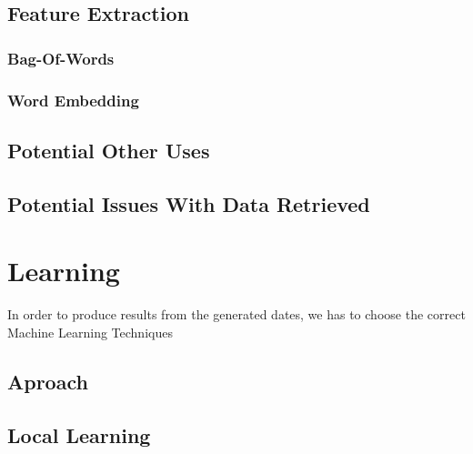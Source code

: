 \documentclass[bsc,frontabs,twoside,singlespacing,parskip,deptreport]{infthesis}     %
\begin{document}
\section{Feature Extraction}
\subsection{Bag-Of-Words}
\subsection{Word Embedding}
\section{Potential Other Uses}
\section{Potential Issues With Data Retrieved}



\chapter{Learning}
In order to produce results from the generated dates,
we has to choose the correct Machine Learning Techniques
\section{Aproach}

\section{Local Learning}
\end{document}
